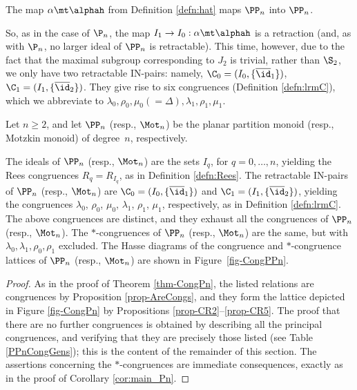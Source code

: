\begin{corollary}
\label{cor:retract_planar}
The map $\alpha\mt\alphah$ from Definition \ref{defn:hat} maps $\PP_n$ into $\PP_n$. \epfres
\end{corollary}

So, as in the case of $\P_n$, the map $I_1\to I_0:\alpha\mt\alphah$ is a retraction (and, as with $\P_n$, no larger ideal of $\PP_n$ is retractable).
This time, however, due to the fact that the maximal subgroup corresponding to $J_2$ is trivial, rather than $\S_2$, we only have two retractable IN-pairs: namely,
$\C_0=(I_0,\{\overline{\id}_1\})$,
$\C_1=(I_1,\{\overline{\id}_2\})$.
They give rise to six congruences (Definition \ref{defn:lrmC}), which we abbreviate to $\lambda_0,\rho_0,\mu_0(=\Delta),\lambda_1,\rho_1,\mu_1$.

\newpage

\begin{thm}\label{thm-CongPPn}
Let $n\geq2$, and let $\PP_n$ (resp., $\Mot_n$) be the planar partition monoid (resp., Motzkin monoid) of degree~$n$, respectively.
\begin{itemize}
 The ideals of $\PP_n$ (resp., $\Mot_n$) are the sets $I_q$, for $q=0,\ldots,n$, yielding the Rees congruences $R_q=R_{I_q}$, as in Definition \ref{defn:Rees}.
 The retractable IN-pairs of $\PP_n$ (resp., $\Mot_n$) are $\C_0=(I_0,\{\overline{\id}_1\})$ and $\C_1=(I_1,\{\overline{\id}_2\})$, yielding the congruences $\lambda_0$, $\rho_0$, $\mu_0$, $\lambda_1$, $\rho_1$, $\mu_1$, respectively, as in Definition \ref{defn:lrmC}.
 The above congruences are distinct, and they exhaust all the congruences of $\PP_n$ (resp., $\Mot_n$).
 The $\ast$-congruences of $\PP_n$ (resp., $\Mot_n$) are the same, but with $\lambda_0,\lambda_1,\rho_0,\rho_1$ excluded.
 The Hasse diagrams of the congruence and $*$-congruence lattices of $\PP_n$ (resp., $\Mot_n$) are shown in Figure~\ref{fig-CongPPn}.
\end{itemize}
\end{thm}

\begin{proof}
As in the proof of Theorem \ref{thm-CongPn}, the
listed relations are congruences by Proposition \ref{prop-AreCongs}, and they form the lattice depicted in Figure \ref{fig-CongPn} by Propositions \ref{prop-CR2}--\ref{prop-CR5}.
The proof that there are no further congruences is obtained by describing all the principal congruences, and verifying that they are precisely those listed (see Table \ref{PPnCongGens});
this is the content of the remainder of this section.
The assertions concerning the $\ast$-congruences are immediate consequences, exactly as in the proof of Corollary \ref{cor:main_Pn}.
\end{proof}



